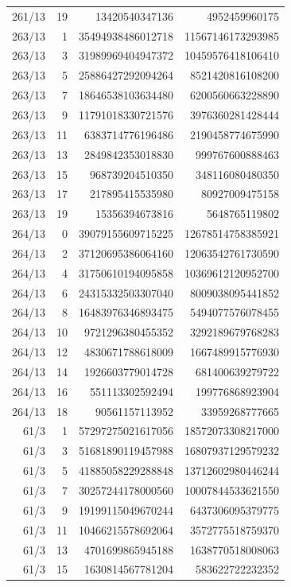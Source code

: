 \begin{longtable}{@{}rrrr@{}}
261/13 & 19 & 13420540347136 & 4952459960175\\
263/13 & 1 & 35494938486012718 & 11567146173293985\\
263/13 & 3 & 31989969404947372 & 10459576418106410\\
263/13 & 5 & 25886427292094264 & 8521420816108200\\
263/13 & 7 & 18646538103634480 & 6200560663228890\\
263/13 & 9 & 11791018330721576 & 3976360281428444\\
263/13 & 11 & 6383714776196486 & 2190458774675990\\
263/13 & 13 & 2849842353018830 & 999767600888463\\
263/13 & 15 & 968739204510350 & 348116080480350\\
263/13 & 17 & 217895415535980 & 80927009475158\\
263/13 & 19 & 15356394673816 & 5648765119802\\
264/13 & 0 & 39079155609715225 & 12678514758385921\\
264/13 & 2 & 37120695386064160 & 12063542761730590\\
264/13 & 4 & 31750610194095858 & 10369612120952700\\
264/13 & 6 & 24315332503307040 & 8009038095441852\\
264/13 & 8 & 16483976346893475 & 5494077576078455\\
264/13 & 10 & 9721296380455352 & 3292189679768283\\
264/13 & 12 & 4830671788618009 & 1667489915776930\\
264/13 & 14 & 1926603779014728 & 681400639279722\\
264/13 & 16 & 551113302592494 & 199776868923904\\
264/13 & 18 & 90561157113952 & 33959268777665\\
61/3 & 1 & 57297275021617056 & 18572073308217000\\
61/3 & 3 & 51681890119457988 & 16807937129579232\\
61/3 & 5 & 41885058229288848 & 13712602980446244\\
61/3 & 7 & 30257244178000560 & 10007844533621550\\
61/3 & 9 & 19199115049670244 & 6437306095379775\\
61/3 & 11 & 10466215578692064 & 3572775518759370\\
61/3 & 13 & 4701699865945188 & 1638770518008063\\
61/3 & 15 & 1630814567781204 & 583622722232352\\

\end{longtable}
